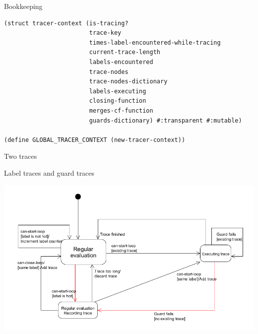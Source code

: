 \documentclass{beamer}
\begin{document}
\begin{frame}[fragile]{Bookkeeping}

\begin{lstlisting}[basicstyle = \scriptsize\ttfamily, escapechar = £]
(struct tracer-context (is-tracing?
                        trace-key
                        times-label-encountered-while-tracing
                        current-trace-length
                        labels-encountered
                        trace-nodes
                        trace-nodes-dictionary
                        labels-executing
                        closing-function
                        merges-cf-function
                        guards-dictionary) #:transparent #:mutable)
                        
(define GLOBAL_TRACER_CONTEXT (new-tracer-context))
\end{lstlisting}

\end{frame}

\begin{frame}{Two traces}

Label traces and guard traces

\centering
\includegraphics[scale=0.3]{high_level_state_diagram_two_traces.png}

\end{frame}
\end{document}
